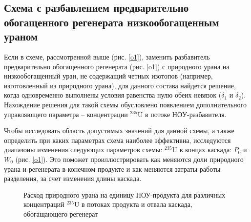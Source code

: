 \subsection{Схема с разбавлением предварительно обогащенного регенерата низкообогащенным ураном}

Если в схеме, рассмотренной выше (рис. \ref{o1}), заменить разбавитель предварительно обогащенного регенерата (рис. \ref{o1}) с природного урана на низкообогащенный уран, не содержащий четных изотопов (например, изготовленный из природного урана), для данного состава найдется решение, когда одновременно выполнены условия равенства нулю обеих невязок ($\delta_1$ и $\delta_2$). Нахождение решения для такой схемы обусловлено появлением дополнительного управляющего параметра -- концентрации $^{235}$U в потоке $НОУ$-разбавителя.

Чтобы исследовать область допустимых значений для данной схемы, а также определить при каких параметрах схема наиболее эффективна, исследуются диапазоны изменения следующих параметров схемы: $^{235}$U в концах каскада: $P_0$ и $W_0$ (рис. \ref{o1}). Это поможет проиллюстрировать как меняются доли природного урана и регенерата в конечном продукте и как меняются затраты работы разделения, за счет изменения длины каскада.

\begin{figure}[ht]
  \caption{Расход природного урана на единицу НОУ-продукта  для различных концентраций $^{235}$U в потоках продукта и отвала каскада, обогащающего регенерат}\label{fig:sc2_2}
\end{figure}

